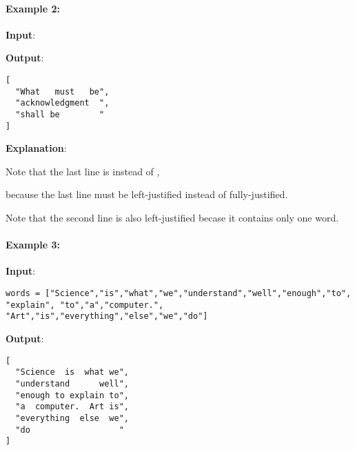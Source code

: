 \paragraph{Example 2:}
\begin{flushleft}

\textbf{Input}:



\textbf{Output}:
\begin{lstlisting}[style=customc]
[
  "What   must   be",
  "acknowledgment  ",
  "shall be        "
]
\end{lstlisting}

\textbf{Explanation}: 

Note that the last line is  instead of ,

because the last line must be left-justified instead of fully-justified.

Note that the second line is also left-justified becase it contains only one word.

\end{flushleft}

\paragraph{Example 3:}
\begin{flushleft}


\textbf{Input}:
\begin{lstlisting}[style=customc]
words = ["Science","is","what","we","understand","well","enough","to",
"explain", "to","a","computer.",
"Art","is","everything","else","we","do"]
\end{lstlisting}


\textbf{Output}:
\begin{lstlisting}[style=customc]
[
  "Science  is  what we",
  "understand      well",
  "enough to explain to",
  "a  computer.  Art is",
  "everything  else  we",
  "do                  "
]
\end{lstlisting}
\end{flushleft}